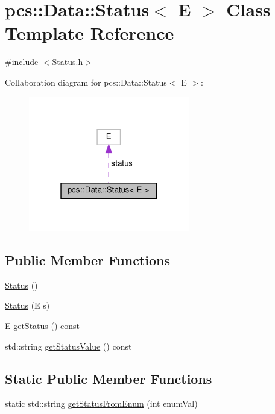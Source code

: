 \hypertarget{classpcs_1_1Data_1_1Status}{}\section{pcs\+:\+:Data\+:\+:Status$<$ E $>$ Class Template Reference}
\label{classpcs_1_1Data_1_1Status}


{\ttfamily \#include $<$Status.\+h$>$}



Collaboration diagram for pcs\+:\+:Data\+:\+:Status$<$ E $>$\+:\nopagebreak
\begin{figure}[H]
\begin{center}
\leavevmode
\includegraphics[width=199pt]{classpcs_1_1Data_1_1Status__coll__graph}
\end{center}
\end{figure}
\subsection*{Public Member Functions}
\begin{DoxyCompactItemize}
\item 
\hyperlink{classpcs_1_1Data_1_1Status_a18ca779bdb37325922a8ecfac2918581}{Status} ()
\item 
\hyperlink{classpcs_1_1Data_1_1Status_a8a3b6c8f56f255f530c89bd39ffae649}{Status} (E s)
\item 
E \hyperlink{classpcs_1_1Data_1_1Status_a9a184267d589bc424eb89eafc931020f}{get\+Status} () const
\item 
std\+::string \hyperlink{classpcs_1_1Data_1_1Status_aeb95e9e9d69821ac78e4a8d2b81d7d32}{get\+Status\+Value} () const
\end{DoxyCompactItemize}
\subsection*{Static Public Member Functions}
\begin{DoxyCompactItemize}
\item 
static std\+::string \hyperlink{classpcs_1_1Data_1_1Status_a0c70547d47682d60e07663393d2ab662}{get\+Status\+From\+Enum} (int enum\+Val)
\end{DoxyCompactItemize}
